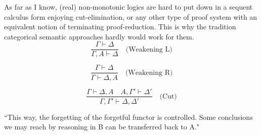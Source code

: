 \documentclass[a4paper,11pt]{report}
\begin{document}
As far as I know, (real) non-monotonic logics are hard to put down in a sequent calculus form enjoying cut-elimination, or any other type of proof system with an equivalent notion of terminating proof-reduction. This is why the tradition categorical semantic approaches hardly would work for them.
\[
\frac{\Gamma \vdash \Delta}{\Gamma, A \vdash \Delta} \quad \text{(Weakening L)}
\]

\[
\frac{\Gamma \vdash \Delta}{\Gamma \vdash \Delta, A} \quad \text{(Weakening R)}
\]

\[
\frac{\Gamma \vdash \Delta, A \quad A, \Gamma' \vdash \Delta'}{\Gamma, \Gamma' \vdash \Delta, \Delta'} \quad \text{(Cut)}
\]


``This way, the forgetting of the forgetful functor is controlled.
Some conclusions we may reach by reasoning in B can be transferred
back to A." 
\end{document}
